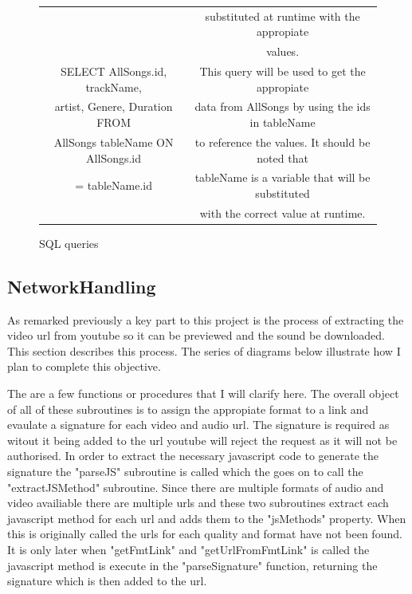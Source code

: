 \documentclass{article}
\begin{document}
\begin{figure}[H]
\begin{center}
\begin{tabular} { | c | c | }
                                             &substituted at runtime with the appropiate      \\
                                             &values.                                         \\ \hline
            SELECT AllSongs.id, trackName,   &This query will be used to get the appropiate   \\
            artist, Genere, Duration FROM    &data from AllSongs by using the ids in tableName\\
            AllSongs tableName ON AllSongs.id&to reference the values. It should be noted that\\
             = tableName.id                  &tableName is a variable that will be substituted\\
                                             &with the correct value at runtime.              \\ \hline
        \end{tabular}
    \end{center}
    \caption{SQL queries} \label{fig:SQLTable}
\end{figure}
\subsection{NetworkHandling}\label{NetworkHandling}
As remarked previously a key part to this project is the process
of extracting the video url from youtube so it can be previewed
and the sound be downloaded. This section describes this process.
The series of diagrams below illustrate how I plan to complete this
objective.

The are a few functions or procedures that I will clarify here. The overall
object of all of these subroutines is to assign the appropiate format to a
link and evaulate a signature for each video and audio url. The signature is required
as witout it being added to the url youtube will reject the request
as it will not be authorised. In order to extract the necessary javascript code
to generate the signature the "parseJS" subroutine is called which the goes on
to call the "extractJSMethod" subroutine. Since there are multiple formats of
audio and video availiable there are multiple urls and these two subroutines extract each
javascript method for each url and adds them to the "jsMethods" property. When this
is originally called the urls for each quality and format have not been found. It is only later
when "getFmtLink" and "getUrlFromFmtLink" is called the javascript method is
execute in the "parseSignature" function, returning the signature which is then
added to the url.
\end{document}
